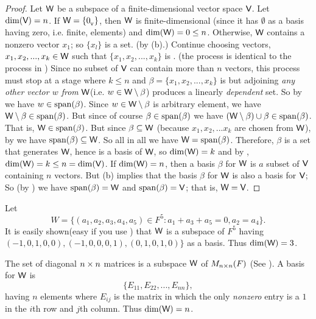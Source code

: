 \begin{proof}
Let \(\textsf{W}\) be a subspace of a finite-dimensional vector space \(\textsf{V}\).
Let \(\dim(\textsf{V}) = n\).
If \(\textsf{W} = \{ 0_{_{\textsf{V}}} \}\), then \(\textsf{W}\) is finite-dimensional
(since it has \(\emptyset\) as a basis having zero, i.e. finite, elements)
and \(\dim(\textsf{W}) = 0 \le n\).
Otherwise, \(\textsf{W}\) contains a nonzero vector \(x_1\);
so \(\{ x_l \}\) is a \LID{} set. (by (b).)
Continue choosing vectors, \(x_1, x_2 , ..., x_k \in \textsf{W}\) such that \(\{ x_1, x_2, ..., x_k \}\) is \LID{}.
(the process is identical to the process in )
Since no \LID{} subset of \(\textsf{V}\) can contain more than \(n\) vectors, this process must stop at a stage where \(k \le n\)  and \(\beta = \{ x_1, x_2, ..., x_k \}\) is \LID{} but adjoining \emph{any other vector \(w\) from} \(\textsf{W}\)(i.e. \(w \in \textsf{W} \setminus \beta\)) produces a linearly \emph{dependent} set.
So by  we have \(w \in \operatorname{span}(\beta)\).
Since \(w \in \textsf{W} \setminus \beta\) is arbitrary element, we have \(\textsf{W} \setminus \beta \in \operatorname{span}(\beta)\).
But since of course \(\beta \in \operatorname{span}(\beta)\) we have \((\textsf{W} \setminus \beta) \cup \beta \in \operatorname{span}(\beta)\).
That is, \(\textsf{W} \in \operatorname{span}(\beta)\).
But since \(\beta \subseteq \textsf{W}\) (because \(x_1, x_2, ... x_k\) are chosen from \(\textsf{W}\)), by  we have \(\operatorname{span}(\beta) \subseteq \textsf{W}\).
So all in all we have \(\textsf{W} = \operatorname{span}(\beta)\).
Therefore, \(\beta\) is a \LID{} set that generates \(\textsf{W}\), hence is a basis of \(\textsf{W}\), so \(\dim(\textsf{W}) = k\) and by , \(\dim(\textsf{W}) = k \le n = \dim(\textsf{V})\).
If \(\dim(\textsf{W}) = n\), then a basis \(\beta\) for \(\textsf{W}\) is \(a\) \LID{} subset of \(\textsf{V}\) containing \(n\) vectors.
But (b) implies that the basis \(\beta\) for \(\textsf{W}\) is also a basis for \(\textsf{V}\);
So (by ) we have \(\operatorname{span}(\beta) = \textsf{W}\) and \(\operatorname{span}(\beta) = \textsf{V}\);
that is, \(\textsf{W} = \textsf{V}\).
\end{proof}

\begin{example} \label{example 1.6.18}
Let
\[
    W = \{ ( a_1, a_2, a_3, a_4, a_5) \in F^5 : a_1 + a_3 + a_5 = 0, a_2 = a_4 \}.
\]
\sloppy It is easily shown(easy if you use ) that \(\textsf{W}\) is a subspace of \(F^5\) having \( (-1, 0, 1, 0, 0), (-1, 0, 0, 0, 1), (0, 1, 0,1, 0)\}\) as a basis.
Thus \(\dim(\textsf{W}) = 3\).
\end{example}

\begin{example} \label{example 1.6.19}
The set of diagonal \(n \times n\) matrices is a subspace \(\textsf{W}\) of \(M_{n \times n}(F)\) (See ).
A basis for \(\textsf{W}\) is
\[
    \{ E_{11}, E_{22}, ..., E_{nn} \},
\]
having \(n\) elements where \(E_{ij}\) is the matrix in which the only \emph{nonzero} entry is a \(1\) in the \(i\)th row and \(j\)th column.
Thus \(\dim(\textsf{W}) = n\).
\end{example}

